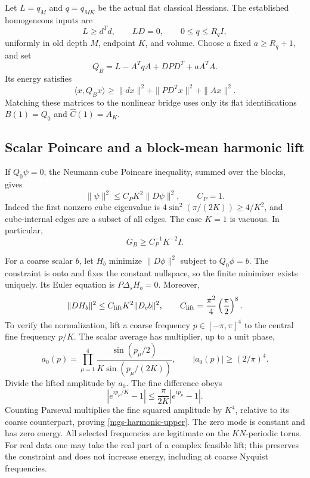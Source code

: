 \documentclass[11pt]{article}
\theoremstyle{remark}
\begin{document}
Let \(L=q_M\) and \(q=q_{MK}\) be the actual flat classical
Hessians. The established homogeneous inputs are
\begin{equation}
 L\ge d^Td,\qquad LD=0,\qquad 0\le q\le R_qI,
 \label{mgs-classical-inputs}
\end{equation}
uniformly in old depth \(M\), endpoint \(K\), and volume.
Choose a fixed \(a\ge R_q+1\), and set
\begin{equation}
 Q_B=L-A^TqA+DPD^T+aA^TA.
 \label{mgs-vector}
\end{equation}
Its energy satisfies
\begin{equation}
 \langle x,Q_Bx\rangle
 \ge \|dx\|^2+\|PD^Tx\|^2+\|Ax\|^2.
 \label{mgs-energy-lower}
\end{equation}
Matching these matrices to the nonlinear bridge uses only its
flat identifications \(B(1)=Q_0\) and \(\widehat C(1)=A_K\).

\subsection{Scalar Poincare and a block-mean harmonic lift}
\label{mgs-scalar-section}

If \(Q_0\psi=0\), the Neumann cube Poincare inequality, summed
over the blocks, gives
\begin{equation}
 \|\psi\|^2\le C_PK^2\|D\psi\|^2,\qquad C_P=1.
 \label{mgs-poincare}
\end{equation}
Indeed the first nonzero cube eigenvalue is
\(4\sin^2(\pi/(2K))\ge4/K^2\), and cube-internal edges
are a subset of all edges.
The case \(K=1\) is vacuous.
In particular,
\begin{equation}
                         G_B\ge C_P^{-1}K^{-2}I.
 \label{mgs-ghost-gap}
\end{equation}

For a coarse scalar \(b\), let \(H_b\) minimize
\(\|D\phi\|^2\) subject to \(Q_0\phi=b\).
The constraint is onto and fixes the constant nullspace, so the
finite minimizer exists uniquely. Its Euler equation is
\(P\Delta_sH_b=0\).
Moreover,
\begin{equation}
 \|DH_b\|^2\le C_{\rm lift}K^2\|D_cb\|^2,\qquad
 C_{\rm lift}=\frac{\pi^2}{4}\left(\frac\pi2\right)^8.
 \label{mgs-harmonic-upper}
\end{equation}
To verify the normalization, lift a coarse frequency
\(p\in[-\pi,\pi]^4\) to the central fine frequency \(p/K\).
The scalar average has multiplier, up to a unit phase,
\[
 a_0(p)=\prod_{\mu=1}^4
      \frac{\sin(p_\mu/2)}{K\sin(p_\mu/(2K))},
 \qquad |a_0(p)|\ge(2/\pi)^4.
\]
Divide the lifted amplitude by \(a_0\).
The fine difference obeys
\[
 |e^{ip_\mu/K}-1|
       \le\frac{\pi}{2K}|e^{ip_\mu}-1|.
\]
Counting Parseval multiplies the fine squared amplitude by
\(K^4\), relative to its coarse counterpart, proving
\eqref{mgs-harmonic-upper}.
The zero mode is constant and has zero energy.
All selected frequencies are legitimate on the \(KN\)-periodic
torus. For real data one may take the real part of a complex
feasible lift; this preserves the constraint and does not
increase energy, including at coarse Nyquist frequencies.
\end{document}
